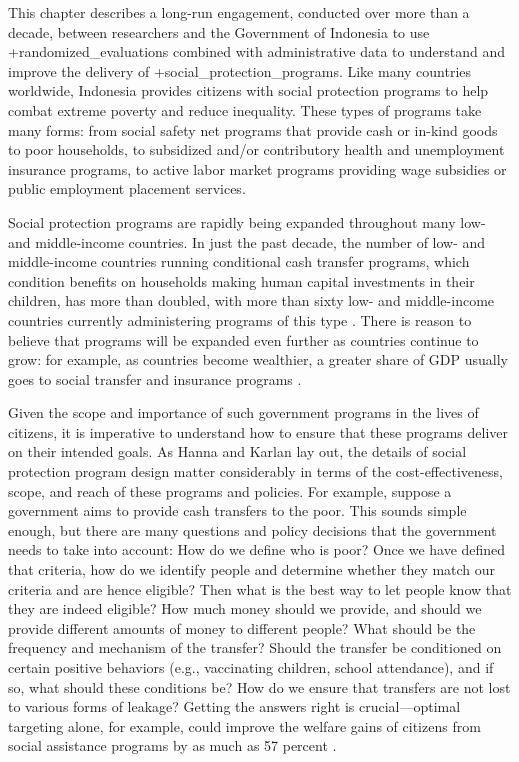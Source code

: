 \documentclass[
]{WileySix}
\begin{document}
This chapter describes a long-run engagement, conducted over more than a decade, between researchers and the Government of Indonesia to use +randomized\_evaluations\textbar{} combined with administrative data to understand and improve the delivery of +social\_protection\_programs\textbar. Like many countries worldwide, Indonesia provides citizens with social protection programs to help combat extreme poverty and reduce inequality. These types of programs take many forms: from social safety net programs that provide cash or in-kind goods to poor households, to subsidized and/or contributory health and unemployment insurance programs, to active labor market programs providing wage subsidies or public employment placement services.

Social protection programs are rapidly being expanded throughout many low- and middle-income countries. In just the past decade, the number of low- and middle-income countries running conditional cash transfer programs, which condition benefits on households making human capital investments in their children, has more than doubled, with more than sixty low- and middle-income countries currently administering programs of this type \citep{worldbank2018}. There is reason to believe that programs will be expanded even further as countries continue to grow: for example, as countries become wealthier, a greater share of GDP usually goes to social transfer and insurance programs \citep{chetty2006}.

Given the scope and importance of such government programs in the lives of citizens, it is imperative to understand how to ensure that these programs deliver on their intended goals. As Hanna and Karlan \citeyearpar{hanna2017} lay out, the details of social protection program design matter considerably in terms of the cost-effectiveness, scope, and reach of these programs and policies. For example, suppose a government aims to provide cash transfers to the poor. This sounds simple enough, but there are many questions and policy decisions that the government needs to take into account: How do we define who is poor? Once we have defined that criteria, how do we identify people and determine whether they match our criteria and are hence eligible? Then what is the best way to let people know that they are indeed eligible? How much money should we provide, and should we provide different amounts of money to different people? What should be the frequency and mechanism of the transfer? Should the transfer be conditioned on certain positive behaviors (e.g., vaccinating children, school attendance), and if so, what should these conditions be? How do we ensure that transfers are not lost to various forms of leakage? Getting the answers right is crucial---optimal targeting alone, for example, could improve the welfare gains of citizens from social assistance programs by as much as 57 percent \citep{alatas2019}.
\end{document}
